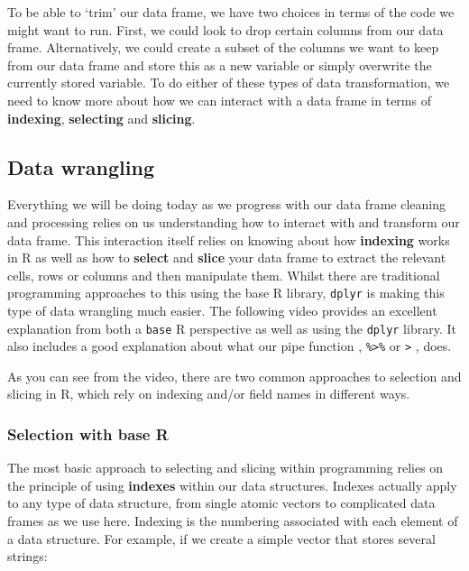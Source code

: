 \documentclass[
]{book}
\begin{document}
To be able to `trim' our data frame, we have two choices in terms of the code we might want to run. First, we could look to drop certain columns from our data frame. Alternatively, we could create a subset of the columns we want to keep from our data frame and store this as a new variable or simply overwrite the currently stored variable. To do either of these types of data transformation, we need to know more about how we can interact with a data frame in terms of \textbf{indexing}, \textbf{selecting} and \textbf{slicing}.

\hypertarget{data-wrangling}{%
\subsection{Data wrangling}\label{data-wrangling}}

Everything we will be doing today as we progress with our data frame cleaning and processing relies on us understanding how to interact with and transform our data frame. This interaction itself relies on knowing about how \textbf{indexing} works in R as well as how to \textbf{select} and \textbf{slice} your data frame to extract the relevant cells, rows or columns and then manipulate them. Whilst there are traditional programming approaches to this using the base R library, \texttt{dplyr} is making this type of data wrangling much easier. The following video provides an excellent explanation from both a \texttt{base} R perspective as well as using the \texttt{dplyr} library. It also includes a good explanation about what our pipe function , \texttt{\%\textgreater{}\%} or \texttt{\textbar{}\textgreater{}} , does.

As you can see from the video, there are two common approaches to selection and slicing in R, which rely on indexing and/or field names in different ways.

\hypertarget{selection-with-base-r}{%
\subsubsection{Selection with base R}\label{selection-with-base-r}}

The most basic approach to selecting and slicing within programming relies on the principle of using \textbf{indexes} within our data structures. Indexes actually apply to any type of data structure, from single atomic vectors to complicated data frames as we use here. Indexing is the numbering associated with each element of a data structure. For example, if we create a simple vector that stores several strings:
\end{document}

